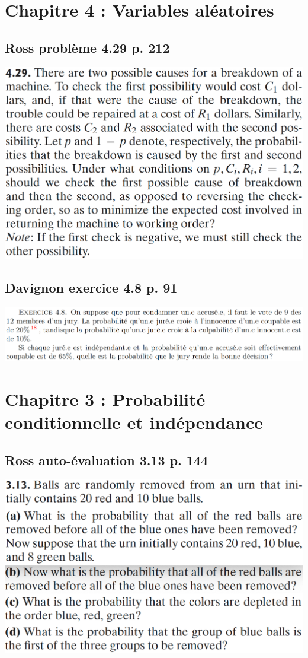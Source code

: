 \documentclass[11pt]{article}
\begin{document}
	\section{Chapitre 4 : Variables aléatoires}
	\subsection{Ross problème 4.29 p. 212}
	\includegraphics[width=.7\linewidth]{p4_29_p212}
	\newpage
	
	\subsection{Davignon exercice 4.8 p. 91}
	\includegraphics[width=\linewidth]{dvg_4_8_p91}
	\newpage
	
	\section{Chapitre 3 : Probabilité conditionnelle et indépendance}
	\subsection{Ross auto-évaluation 3.13 p. 144}
	\includegraphics[width=.7\linewidth]{a3_13_p144}
	
\end{document}
